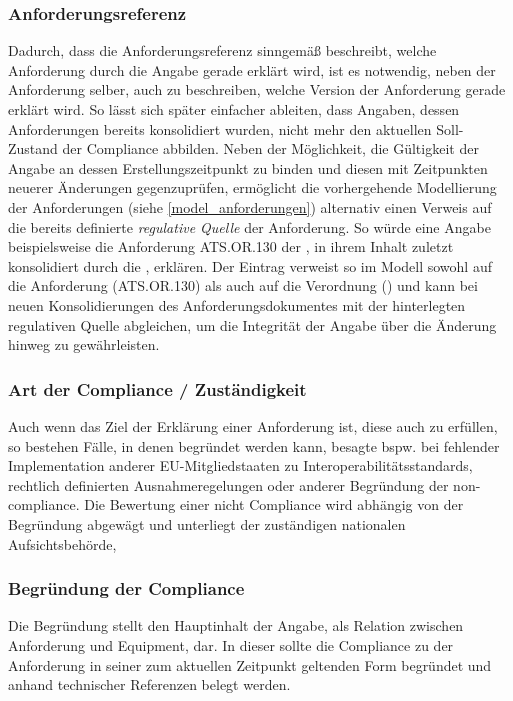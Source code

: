\pagebreak
\subsubsection{Anforderungsreferenz}
    
    Dadurch, dass die Anforderungsreferenz sinngemäß beschreibt, welche Anforderung durch die Angabe gerade erklärt wird, ist es notwendig, neben der Anforderung selber, auch zu beschreiben, welche Version der Anforderung gerade erklärt wird. 
    So lässt sich später einfacher ableiten, dass Angaben, dessen Anforderungen bereits konsolidiert wurden, nicht mehr den aktuellen Soll-Zustand der Compliance abbilden. 
    Neben der Möglichkeit, die Gültigkeit der Angabe an dessen Erstellungszeitpunkt zu binden und diesen mit Zeitpunkten neuerer Änderungen gegenzuprüfen, ermöglicht die vorhergehende Modellierung der Anforderungen (siehe \ref{model_anforderungen}) alternativ einen Verweis auf die bereits definierte \textit{regulative Quelle} der Anforderung. 
    So würde eine Angabe beispielsweise die Anforderung \textsf{ATS.OR.130} der , in ihrem Inhalt zuletzt konsolidiert durch die , erklären. 
    Der Eintrag verweist so im Modell sowohl auf die Anforderung (\textsf{ATS.OR.130}) als auch auf die Verordnung () und kann bei neuen Konsolidierungen des Anforderungsdokumentes mit der hinterlegten regulativen Quelle abgleichen, um die Integrität der Angabe über die Änderung hinweg zu gewährleisten.

\subsubsection{Art der Compliance / Zuständigkeit}
    
    Auch wenn das Ziel der Erklärung einer Anforderung ist, diese auch zu erfüllen, so bestehen Fälle, in denen begründet werden kann, besagte 
    bspw. bei fehlender Implementation anderer EU-Mitgliedstaaten zu Interoperabilitätsstandards, rechtlich definierten Ausnahmeregelungen oder anderer Begründung der non-compliance.
    Die Bewertung einer nicht Compliance wird abhängig von der Begründung abgewägt und unterliegt der zuständigen nationalen Aufsichtsbehörde, 

\subsubsection{Begründung der Compliance}
    
    Die Begründung stellt den Hauptinhalt der Angabe, als Relation zwischen Anforderung und Equipment, dar. 
    In dieser sollte die Compliance zu der Anforderung in seiner zum aktuellen Zeitpunkt geltenden Form begründet und anhand technischer Referenzen belegt werden.

